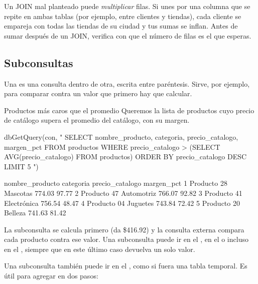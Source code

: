 \begin{advertencia}
Un JOIN mal planteado puede \emph{multiplicar} filas. Si unes por una
columna que se repite en ambas tablas (por ejemplo,  entre
clientes y tiendas), cada cliente se empareja con todas las tiendas de su
ciudad y tus sumas se inflan. Antes de sumar después de un JOIN, verifica
con  que el número de filas es el que esperas.
\end{advertencia}

\subsection{Subconsultas}

Una  es una consulta dentro de otra, escrita entre
paréntesis. Sirve, por ejemplo, para comparar contra un valor que primero
hay que calcular.

\begin{ejemplo}{Productos más caros que el promedio}
Queremos la lista de productos cuyo precio de catálogo supera el promedio
del catálogo, con su margen.
\end{ejemplo}

\begin{rcode}
dbGetQuery(con, "
  SELECT nombre_producto, categoria, precio_catalogo, margen_pct
  FROM productos
  WHERE precio_catalogo > (SELECT AVG(precio_catalogo)
                           FROM productos)
  ORDER BY precio_catalogo DESC
  LIMIT 5
")
\end{rcode}

\begin{rsalida}
  nombre_producto   categoria precio_catalogo margen_pct
1     Producto 28    Mascotas          774.03      97.77
2     Producto 47  Automotriz          766.07      92.82
3     Producto 41 Electrónica          756.54      48.47
4     Producto 04    Juguetes          743.84      72.42
5     Producto 20     Belleza          741.63      81.42
\end{rsalida}

La subconsulta  se
calcula primero (da \$416.92) y la consulta externa compara cada producto
contra ese valor. Una subconsulta puede ir en el , en el
 o incluso en el , siempre que en este último
caso devuelva un solo valor.

Una subconsulta también puede ir en el , como si fuera una
tabla temporal. Es útil para agregar en dos pasos:

